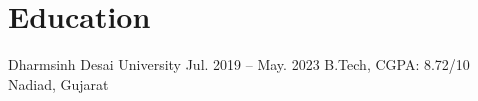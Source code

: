 \section{Education}

\resumeSubheading
  {Dharmsinh Desai University}
  {Jul. 2019 – May. 2023}
  {B.Tech, CGPA: 8.72/10}
  {Nadiad, Gujarat}
